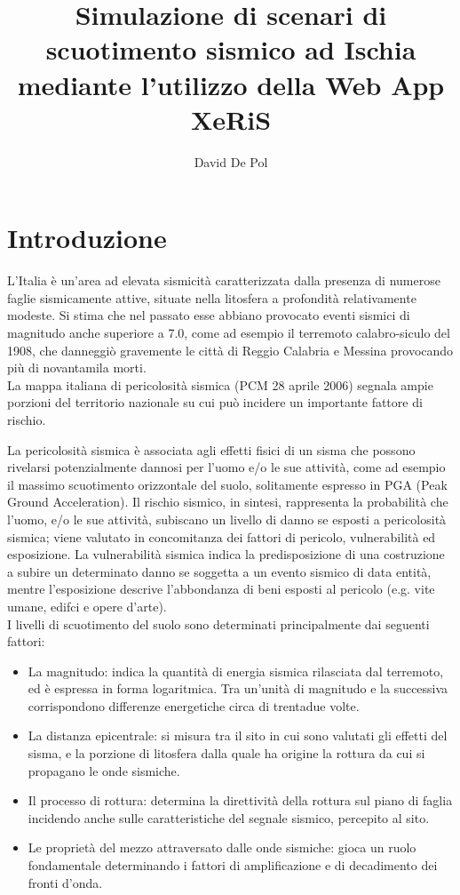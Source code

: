 \documentclass[a4paper,12pt,titlepage]{article}
\begin{document}
\author{David De Pol}
\title{Simulazione di scenari di scuotimento
sismico ad Ischia mediante l'utilizzo
della Web App XeRiS}
\maketitle
\tableofcontents
\clearpage

\section{Introduzione}

L'Italia è un'area ad elevata sismicità caratterizzata dalla presenza di numerose faglie sismicamente attive, situate nella litosfera a profondità relativamente               modeste. Si stima che nel passato esse abbiano provocato eventi 
sismici di magnitudo anche superiore a 7.0, come ad esempio il terremoto
calabro-siculo del 1908, che danneggiò gravemente le città di Reggio Calabria e Messina provocando più di novantamila morti.\\
La mappa italiana di pericolosità sismica (PCM 28 aprile 2006) segnala ampie porzioni del territorio nazionale su cui può incidere un importante fattore di rischio.

La pericolosità sismica è associata agli effetti fisici di un sisma che possono rivelarsi potenzialmente dannosi per l'uomo e/o le sue attività, come ad
esempio il massimo scuotimento orizzontale del suolo, solitamente espresso in PGA (Peak Ground Acceleration). Il rischio sismico, in sintesi, rappresenta
la probabilità che l'uomo, e/o le sue attività, subiscano un livello di danno se esposti a pericolosità sismica; viene valutato in concomitanza dei fattori di
pericolo, vulnerabilità ed esposizione. La vulnerabilità sismica indica la predisposizione di una costruzione a subire un determinato danno se soggetta a
un evento sismico di data entità, mentre l'esposizione descrive l'abbondanza di beni esposti al pericolo (e.g. vite umane, edifci e opere d'arte).\\
I livelli di scuotimento del suolo sono determinati principalmente dai seguenti fattori:\\

\begin{itemize}
\item  La magnitudo: indica la quantità di energia sismica rilasciata dal terremoto, ed è espressa in forma logaritmica. Tra un'unità di magnitudo e la
successiva corrispondono differenze energetiche circa di trentadue volte.
\item  La distanza epicentrale: si misura tra il sito in cui sono valutati gli effetti del sisma, e la porzione di litosfera dalla quale ha origine la rottura da cui si propagano le onde sismiche.
\item  Il processo di rottura: determina la direttività della rottura sul piano di faglia incidendo anche sulle caratteristiche del segnale sismico, percepito al sito.
\item  Le proprietà del mezzo attraversato dalle onde sismiche: gioca un ruolo fondamentale determinando i fattori di amplificazione e di decadimento
dei fronti d'onda.
\end{itemize}
\end{document}
